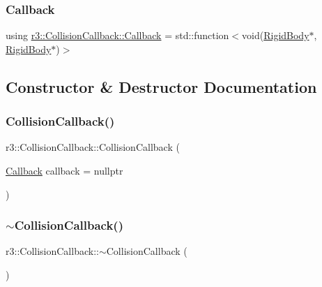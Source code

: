 \subsubsection{\texorpdfstring{Callback}{Callback}}
{\footnotesize\ttfamily using \mbox{\hyperlink{classr3_1_1_collision_callback_afcd5494eafdbd1a0956589b6ec9c0728}{r3\+::\+Collision\+Callback\+::\+Callback}} =  std\+::function$<$void(\mbox{\hyperlink{classr3_1_1_rigid_body}{Rigid\+Body}}$\ast$, \mbox{\hyperlink{classr3_1_1_rigid_body}{Rigid\+Body}}$\ast$)$>$}



\subsection{Constructor \& Destructor Documentation}
\mbox{\label{classr3_1_1_collision_callback_ad18bc4d3c1e63ade9cb9ec420de59591}} 
\subsubsection{\texorpdfstring{Collision\+Callback()}{CollisionCallback()}}
{\footnotesize\ttfamily r3\+::\+Collision\+Callback\+::\+Collision\+Callback (\begin{DoxyParamCaption}\item[{\mbox{\hyperlink{classr3_1_1_collision_callback_afcd5494eafdbd1a0956589b6ec9c0728}{Callback}}}]{callback = {\ttfamily nullptr} }\end{DoxyParamCaption})\hspace{0.3cm}{\ttfamily [explicit]}}

\mbox{\label{classr3_1_1_collision_callback_af85a61a2c9b93718f6930bb21e27faa0}} 
\subsubsection{\texorpdfstring{$\sim$\+Collision\+Callback()}{~CollisionCallback()}}
{\footnotesize\ttfamily r3\+::\+Collision\+Callback\+::$\sim$\+Collision\+Callback (\begin{DoxyParamCaption}{ }\end{DoxyParamCaption})\hspace{0.3cm}{\ttfamily [default]}}



